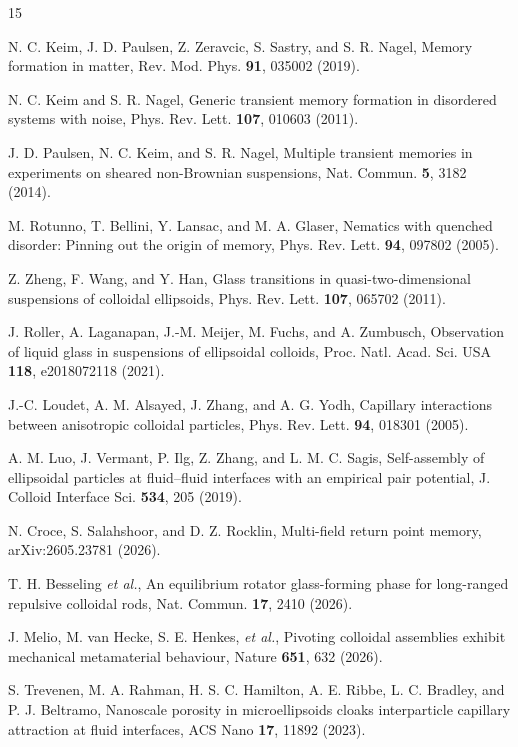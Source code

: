 \documentclass[aps,prl,reprint,superscriptaddress,nofootinbib,floatfix]{revtex4-2}
\begin{document}
\begin{thebibliography}{15}

N. C. Keim, J. D. Paulsen, Z. Zeravcic, S. Sastry, and S. R. Nagel,
Memory formation in matter,
Rev. Mod. Phys. \textbf{91}, 035002 (2019).

N. C. Keim and S. R. Nagel,
Generic transient memory formation in disordered systems with noise,
Phys. Rev. Lett. \textbf{107}, 010603 (2011).

J. D. Paulsen, N. C. Keim, and S. R. Nagel,
Multiple transient memories in experiments on sheared non-Brownian suspensions,
Nat. Commun. \textbf{5}, 3182 (2014).

M. Rotunno, T. Bellini, Y. Lansac, and M. A. Glaser,
Nematics with quenched disorder: Pinning out the origin of memory,
Phys. Rev. Lett. \textbf{94}, 097802 (2005).

Z. Zheng, F. Wang, and Y. Han,
Glass transitions in quasi-two-dimensional suspensions of colloidal ellipsoids,
Phys. Rev. Lett. \textbf{107}, 065702 (2011).

J. Roller, A. Laganapan, J.-M. Meijer, M. Fuchs, and A. Zumbusch,
Observation of liquid glass in suspensions of ellipsoidal colloids,
Proc. Natl. Acad. Sci. USA \textbf{118}, e2018072118 (2021).

J.-C. Loudet, A. M. Alsayed, J. Zhang, and A. G. Yodh,
Capillary interactions between anisotropic colloidal particles,
Phys. Rev. Lett. \textbf{94}, 018301 (2005).

A. M. Luo, J. Vermant, P. Ilg, Z. Zhang, and L. M. C. Sagis,
Self-assembly of ellipsoidal particles at fluid--fluid interfaces with an empirical pair potential,
J. Colloid Interface Sci. \textbf{534}, 205 (2019).

N. Croce, S. Salahshoor, and D. Z. Rocklin,
Multi-field return point memory,
arXiv:2605.23781 (2026).

T. H. Besseling \textit{et al.},
An equilibrium rotator glass-forming phase for long-ranged repulsive colloidal rods,
Nat. Commun. \textbf{17}, 2410 (2026).

J. Melio, M. van Hecke, S. E. Henkes, \textit{et al.},
Pivoting colloidal assemblies exhibit mechanical metamaterial behaviour,
Nature \textbf{651}, 632 (2026).

S. Trevenen, M. A. Rahman, H. S. C. Hamilton, A. E. Ribbe,
L. C. Bradley, and P. J. Beltramo,
Nanoscale porosity in microellipsoids cloaks interparticle capillary attraction at fluid interfaces,
ACS Nano \textbf{17}, 11892 (2023).


\end{thebibliography}
\end{document}

